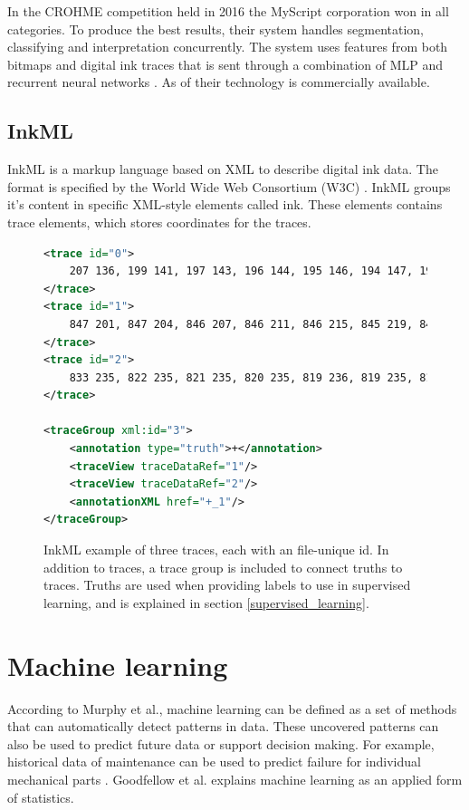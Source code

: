 In the CROHME competition held in 2016 the MyScript corporation won in all categories. To produce the best results, their system handles segmentation, classifying and interpretation concurrently. The system uses features from both bitmaps and digital ink traces that is sent through a combination of MLP and recurrent neural networks \cite{mouchere_icfhr2016_2016}. As of \mydate their technology is commercially available.

\subsection{InkML}
InkML is a markup language based on XML to describe digital ink data. The format is specified by the World Wide Web Consortium (W3C) \cite{chee_ink_2011}. InkML groups it's content in specific XML-style elements called ink. These elements contains trace elements, which stores coordinates for the traces. 


\begin{figure}[H]
\begin{lstlisting}[language=XML]
<trace id="0">
    207 136, 199 141, 197 143, 196 144, 195 146, 194 147, 193 149
</trace>
<trace id="1">
    847 201, 847 204, 846 207, 846 211, 846 215, 845 219, 845 222
</trace>
<trace id="2">
    833 235, 822 235, 821 235, 820 235, 819 236, 819 235, 819 236
</trace>

<traceGroup xml:id="3">
	<annotation type="truth">+</annotation>
	<traceView traceDataRef="1"/>
	<traceView traceDataRef="2"/>
	<annotationXML href="+_1"/>
</traceGroup>
\end{lstlisting}

\caption{InkML example of three traces, each with an file-unique id. In addition to traces, a trace group is included to connect truths to traces. Truths are used when providing labels to use in supervised learning, and is explained in section \ref{supervised_learning}.}

\label{fig:InkML_ex}
\end{figure}

\section{Machine learning}
\label{machine_learning}
According to Murphy et al.\cite{murphy_machine_2012}, machine learning can be defined as a set of methods that can automatically detect patterns in data. These uncovered patterns can also be used to predict future data or support decision making. For example, historical data of maintenance can be used to predict failure for individual mechanical parts \parencite{cline_predictive_2017}. Goodfellow et al. explains machine learning as an applied form of statistics. \cite{goodfellow_deep_2016}

